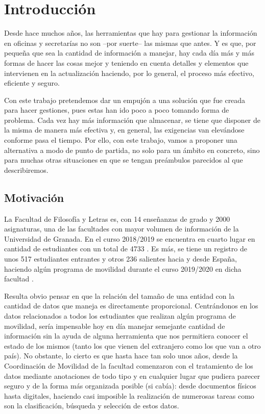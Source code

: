 \section{Introducción}

Desde hace muchos años, las herramientas que hay para gestionar la información en oficinas y secretarías no son --por suerte-- las mismas que antes. Y es que, por pequeña que sea la cantidad de información a manejar, hay cada día más y más formas de hacer las cosas mejor y teniendo en cuenta detalles y elementos que intervienen en la actualización haciendo, por lo general, el proceso más efectivo, eficiente y seguro.

Con este trabajo pretendemos dar un empujón a una solución que fue creada para hacer gestiones, pues estas han ido poco a poco tomando forma de problema. Cada vez hay más información que almacenar, se tiene que disponer de la misma de manera más efectiva y, en general, las exigencias van elevándose conforme pasa el tiempo. Por ello, con este trabajo, vamos a proponer una alternativa a modo de punto de partida, no solo para un ámbito en concreto, sino para muchas otras situaciones en que se tengan preámbulos parecidos al que describiremos. 

\subsection{Motivación}

La Facultad de Filosofía y Letras es, con 14 enseñanzas de grado y 2000 asignaturas, una de las facultades con mayor volumen de información de la Universidad de Granada. En el curso 2018/2019 se encuentra en cuarto lugar en cantidad de estudiantes con un total de 4733 \cite{MemAcademica}. Es más, se tiene un registro de unos 517 estudiantes entrantes y otros 236 salientes hacia y desde España, haciendo algún programa de movilidad durante el curso 2019/2020 en dicha facultad \cite{MemFYL}.

Resulta obvio pensar en que la relación del tamaño de una entidad con la cantidad de datos que maneja es directamente proporcional. Centrándonos en los datos relacionados a todos los estudiantes que realizan algún programa de movilidad, sería impensable hoy en día manejar semejante cantidad de información sin la ayuda de alguna herramienta que nos permitiera conocer el estado de los mismos (tanto los que vienen del extranjero como los que van a otro país). No obstante, lo cierto es que hasta hace tan solo unos años, desde la Coordinación de Movilidad de la facultad comenzaron con el tratamiento de los datos mediante anotaciones de todo tipo y en cualquier lugar que pudiera parecer seguro y de la forma más organizada posible (si cabía): desde documentos físicos hasta digitales, haciendo casi imposible la realización de numerosas tareas como son la clasificación, búsqueda y selección de estos datos.

